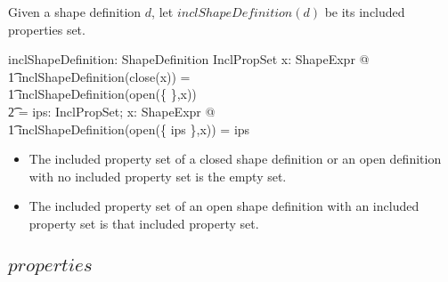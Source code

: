 \documentclass{article}
\begin{document}
Given a shape definition $d$, let $inclShapeDefinition(d)$ be its included properties set.
\begin{axdef}
	inclShapeDefinition: ShapeDefinition \fun InclPropSet
\where
	\forall x: ShapeExpr @ \\
\t1		inclShapeDefinition(close(x)) = \\
\t1		inclShapeDefinition(open(\{ \emptyset \},x)) \\
\t2			= \emptyset
\also
	\forall ips: InclPropSet; x: ShapeExpr @ \\
\t1		inclShapeDefinition(open(\{ ips \},x)) = ips
\end{axdef}
\begin{itemize}
\item The included property set of a closed shape definition or an open definition with no included
property set is the empty set.
\item The included property set of an open shape definition with an included property set is that
included property set.
\end{itemize}

\subsection{$properties$}
\end{document}

